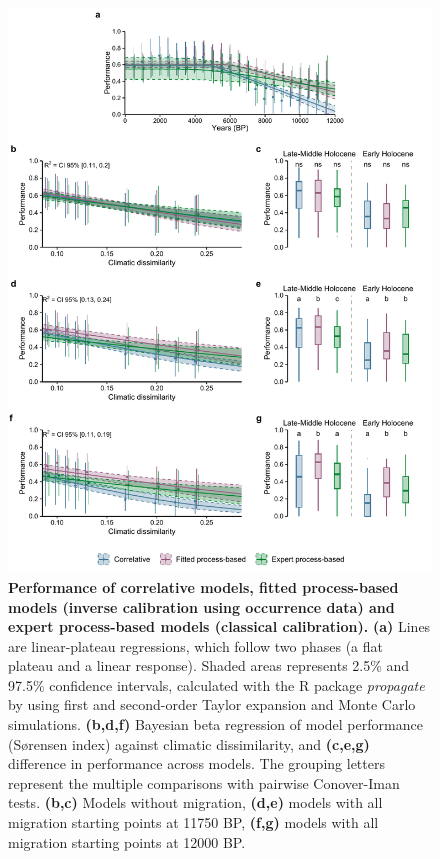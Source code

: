 \documentclass[pdflatex, sn-nature, oneside]{sn-jnl}%
\begin{document}
\begin{figure}
\hspace*{-0.6in}
\centering
\includegraphics{past_performance_differentstarts-1.pdf}
\caption{\textbf{Performance of correlative models, fitted process-based models (inverse calibration using occurrence data) and expert process-based models (classical calibration).}
\textbf{(a)} Lines are linear-plateau regressions, which follow two phases (a flat plateau and a linear response). Shaded areas represents 2.5\% and 97.5\% confidence intervals, calculated with the R package \emph{propagate} \cite{Spiess2018} by using  first and second-order Taylor expansion and Monte Carlo simulations.
\textbf{(b,d,f)} Bayesian beta regression of model performance (Sørensen index) against climatic dissimilarity, and \textbf{(c,e,g)} difference in performance across models. The grouping letters represent the multiple comparisons with pairwise Conover-Iman tests.
\textbf{(b,c)} Models without migration, \textbf{(d,e)} models with all migration starting points at 11750 BP, \textbf{(f,g)} models with all migration starting points at 12000 BP.}
\end{figure}

\clearpage

 
\end{document}
